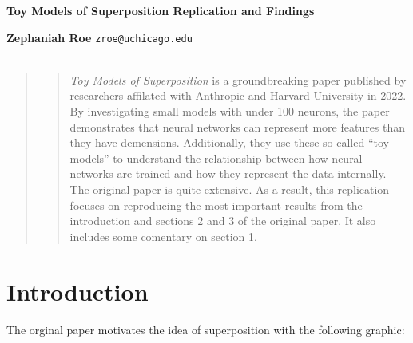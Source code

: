 \documentclass{article} %
\begin{document}


\noindent\makebox[\linewidth]{\rule{\textwidth}{1pt}} 
\vspace*{0mm} %
\begin{center}
    \Large\textbf{Toy Models of Superposition Replication and Findings}
\end{center}
\vspace*{2mm} %
\noindent\makebox[\linewidth]{\rule{\textwidth}{1pt}}
\vspace*{0mm}

\noindent\textbf{Zephaniah Roe} \hfill \texttt{zroe@uchicago.edu}\\
\noindent{} \\





\begin{abstract}
\begin{quote}
    \textit{Toy Models of Superposition}\cite{elhage2022toy} is a groundbreaking paper published by 
    researchers affilated with Anthropic and Harvard University in 2022. By 
    investigating small models with under 100 neurons, the paper demonstrates 
    that neural networks can represent more features than they have demensions. 
    Additionally, they use these so called ``toy models'' to understand the 
    relationship between how neural networks are trained and how they represent 
    the data internally. The original paper is quite extensive. As a result, this
    replication focuses on reproducing the most important results from the  
    introduction and sections 2 and 3 of the original paper. It also includes some
    comentary on section 1.
\end{quote}
\end{abstract}
\section{Introduction}
The orginal paper motivates the idea of superposition with the following graphic:
\end{document}
